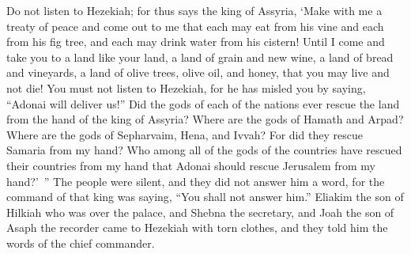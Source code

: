 \begin{biblechapter}
\verse Do not listen to Hezekiah; for thus says the king of Assyria, ‘Make with me a treaty of peace and come out to me that each may eat from his vine and each from his fig tree, and each may drink water from his cistern!
\verse Until I come and take you to a land like your land, a land of grain and new wine, a land of bread and vineyards, a land of olive trees, olive oil, and honey, that you may live and not die! You must not listen to Hezekiah, for he has misled you by saying, “Adonai will deliver us!”
\verse Did the gods of each of the nations ever rescue the land from the hand of the king of Assyria?
\verse Where are the gods of Hamath and Arpad? Where are the gods of Sepharvaim, Hena, and Ivvah? For did they rescue Samaria from my hand?
\verse Who among all of the gods of the countries have rescued their countries from my hand that Adonai should rescue Jerusalem from my hand?’ ”
\verse The people were silent, and they did not answer him a word, for the command of that king was saying, “You shall not answer him.”
\verse Eliakim the son of Hilkiah who was over the palace, and Shebna the secretary, and Joah the son of Asaph the recorder came to Hezekiah with torn clothes, and they told him the words of the chief commander.
\end{biblechapter}

